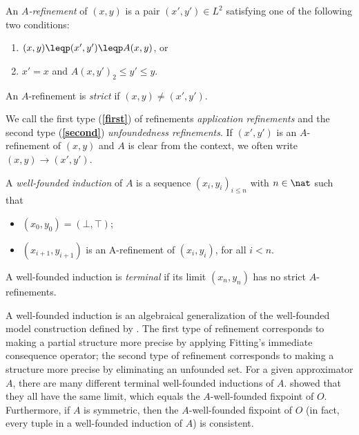 \begin{definition}\label{002:def:refinement}
An \emph{$A$-refinement} of $(x,y)$ is a pair $(x',y')\in L^2$ satisfying one of the following two conditions:
\begin{enumerate}
	\item $(x,y)\leqp(x',y')\leqp A(x,y)$, or \label{first}
	\item $x'=x$ and  $A(x,y')_2\leq y'\leq y$. \label{second}
\end{enumerate}
An $A$-refinement is \emph{strict} if $(x,y)\neq (x',y')$.
\end{definition}

We call the first type (\textbf{\ref{first}}) of refinements \emph{application refinements} and the second type (\textbf{\ref{second}}) \emph{unfoundedness refinements}. If $(x',y')$ is an $A$-refinement of $(x,y)$ and $A$ is clear from the context, we often write $(x,y)\to(x',y')$.
%

 \begin{definition}
 A \emph{well-founded induction} of $A$  is a sequence 
$(x_i,y_i)_{i\leq n}$
with $n\in\nat$ such that 
\begin{itemize}
	\item $(x_0,y_0) = (\bot,\top)$;
	\item $(x_{i+1},y_{i+1})$ is an A-refinement of $(x_{i},y_{i})$, for  all $i<n$.
\end{itemize}
A well-founded induction is \emph{terminal} if its limit $(x_n,y_n)$ has no strict $A$-refinements.
\end{definition}
A well-founded induction is an algebraical generalization of the well-founded model construction defined by \citet{GelderRS91}. 
The first type of refinement corresponds to making a partial structure more precise by applying Fitting's immediate consequence operator; the second type of refinement corresponds to making a structure more precise by eliminating an unfounded set. 
For a given approximator $A$, there are many different terminal well-founded inductions of $A$.
\citet{lpnmr/DeneckerV07}  showed that they all have the same limit, which equals the $A$-well-founded fixpoint of $O$. Furthermore, if $A$ is symmetric, then the $A$-well-founded fixpoint of $O$ (in fact, every tuple in a well-founded induction of $A$) is consistent.


